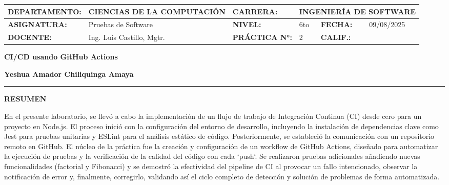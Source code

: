 \documentclass[12pt, a4paper]{article}
\begin{document}
\begin{table}[H]
    \centering
    \setlength{\arrayrulewidth}{0.5pt}
    \renewcommand{\arraystretch}{1.5}
    \small
    \begin{tabular}{|p{3.4cm}|p{4.9cm}|p{2.0cm}|p{1.8cm}|p{2.0cm}|p{1.8cm}|}
    \hline
    \rowcolor{graycell}\textbf{DEPARTAMENTO:} & 
    \cellcolor{white}\textbf{CIENCIAS DE LA COMPUTACI\'ON} & 
    \textbf{CARRERA:} & 
    \multicolumn{3}{p{5.6cm}|}{\cellcolor{white}\textbf{INGENIER\'IA DE SOFTWARE}} \\
    \hline
    \rowcolor{graycell}\textbf{ASIGNATURA:} & 
    \cellcolor{white}Pruebas de Software & 
    \textbf{NIVEL:} & 
    \cellcolor{white}6to & 
    \cellcolor{graycell}\textbf{FECHA:} & 
    \cellcolor{white}09/08/2025 \\
    \hline
    \rowcolor{graycell}\textbf{DOCENTE:} & 
    \cellcolor{white}Ing. Luis Castillo, Mgtr. & 
    \textbf{PR\'ACTICA N°:} & 
    \cellcolor{white}2 & 
    \cellcolor{graycell}\textbf{CALIF.:} & 
    \cellcolor{white} \\
    \hline
    \end{tabular}
\end{table}
\vspace{1cm}

\begin{center}
    \fontsize{14}{16}\selectfont\textbf{CI/CD usando GitHub Actions}
\end{center}

\begin{center}
    \fontsize{12}{14}\selectfont\textbf{Yeshua Amador Chiliquinga Amaya}
    \vspace{0.5cm}
    \rule{\textwidth}{0.5pt}
\end{center}

\begin{center}
    \fontsize{11}{13}\selectfont\textbf{RESUMEN}
    \vspace{0.5cm}
    \parbox{0.9\textwidth}{\justifying
    En el presente laboratorio, se llev\'o a cabo la implementaci\'on de un flujo de trabajo de Integraci\'on Continua (CI) desde cero para un proyecto en Node.js. El proceso inici\'o con la configuraci\'on del entorno de desarrollo, incluyendo la instalaci\'on de dependencias clave como Jest para pruebas unitarias y ESLint para el an\'alisis est\'atico de c\'odigo. Posteriormente, se estableci\'o la comunicaci\'on con un repositorio remoto en GitHub. El n\'ucleo de la pr\'actica fue la creaci\'on y configuraci\'on de un workflow de GitHub Actions, dise\~nado para automatizar la ejecuci\'on de pruebas y la verificaci\'on de la calidad del c\'odigo con cada `push`. Se realizaron pruebas adicionales a\~nadiendo nuevas funcionalidades (factorial y Fibonacci) y se demostr\'o la efectividad del pipeline de CI al provocar un fallo intencionado, observar la notificaci\'on de error y, finalmente, corregirlo, validando as\'i el ciclo completo de detecci\'on y soluci\'on de problemas de forma automatizada.
    }
\end{center}
\vspace{0.5cm}
\end{document}
